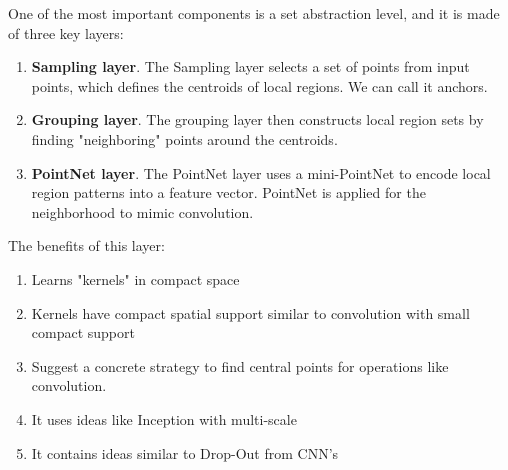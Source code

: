\documentclass[12pt,a4paper]{article}
\theoremstyle{plain}
\begin{document}
One of the most important components is a set abstraction level, and it is made of three key layers:
\begin{enumerate}
	\item \textbf{Sampling layer}. The Sampling layer selects a set of points from input points, which defines the centroids of local regions. We can call it anchors.
	\item \textbf{Grouping layer}. The grouping layer then constructs local region sets by finding "neighboring" points around the centroids.
	\item \textbf{PointNet layer}. The PointNet layer uses a mini-PointNet to encode local region patterns into a feature vector. PointNet is applied for the neighborhood to mimic convolution.
\end{enumerate}

The benefits of this layer:
\begin{enumerate}
	\item Learns "kernels" in compact space
	\item Kernels have compact spatial support similar to convolution with small compact support
	\item Suggest a concrete strategy to find central points for operations like convolution.
	\item It uses ideas like Inception with multi-scale
	\item It contains ideas similar to Drop-Out from CNN's
\end{enumerate}
\end{document}

